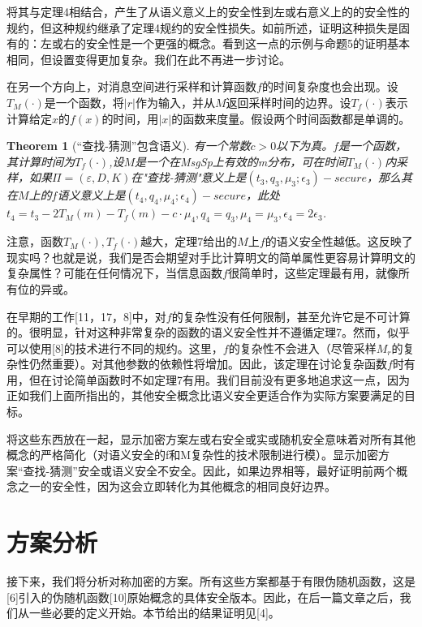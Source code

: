 \documentclass[]{article}
\newtheorem{theorem}{Theorem}
\begin{document}
将其与定理4相结合，产生了从语义意义上的安全性到左或右意义上的的安全性的规约，但这种规约继承了定理4规约的安全性损失。如前所述，证明这种损失是固有的：左或右的安全性是一个更强的概念。看到这一点的示例与命题5的证明基本相同，但设置变得更加复杂。我们在此不再进一步讨论。

在另一个方向上，对消息空间进行采样和计算函数$f$的时间复杂度也会出现。设$T_M(\cdot)$是一个函数，将$|r|$作为输入，并从$M$返回采样时间的边界。设$T_f(\cdot)$表示计算给定$x$的$f(x)$的时间，用$|x|$的函数来度量。假设两个时间函数都是单调的。

\begin{theorem}[“查找-猜测”包含语义]
	有一个常数$c>0$以下为真。$f$是一个函数，其计算时间为$T_f(\cdot)$,设$M$是一个在MsgSp上有效的m分布，可在时间$T_M(\cdot)$内采样，如果$\Pi=(\varepsilon,D,K)$在"查找-猜测"意义上是$(t_3,q_3,\mu_3;\epsilon_3)-secure$，那么其在$M$上的$f$语义意义上是$(t_4,q_4,\mu_4;\epsilon_4)-secure$，此处$t_4=t_3-2T_M(m)-T_f(m)-c\cdot \mu_4,q_4=q_3,\mu_4=\mu_3,\epsilon_4=2\epsilon_3$.
\end{theorem}

注意，函数$T_M(\cdot),T_f(\cdot)$越大，定理7给出的$M$上$f$的语义安全性越低。这反映了现实吗？也就是说，我们是否会期望对手比计算明文的简单属性更容易计算明文的复杂属性？可能在任何情况下，当信息函数$f$很简单时，这些定理最有用，就像所有位的异或。

在早期的工作[11，17，8]中，对$f$的复杂性没有任何限制，甚至允许它是不可计算的。很明显，针对这种非常复杂的函数的语义安全性并不遵循定理7。然而，似乎可以使用[8]的技术进行不同的规约。这里，$f$的复杂性不会进入（尽管采样$M_r$的复杂性仍然重要）。对其他参数的依赖性将增加。因此，该定理在讨论复杂函数$f$时有用，但在讨论简单函数时不如定理7有用。我们目前没有更多地追求这一点，因为正如我们上面所指出的，其他安全概念比语义安全更适合作为实际方案要满足的目标。

将这些东西放在一起，显示加密方案左或右安全或实或随机安全意味着对所有其他概念的严格简化（对语义安全的f和M复杂性的技术限制进行模）。显示加密方案“查找-猜测”安全或语义安全不安全。因此，如果边界相等，最好证明前两个概念之一的安全性，因为这会立即转化为其他概念的相同良好边界。

\section{方案分析}

接下来，我们将分析对称加密的方案。所有这些方案都基于有限伪随机函数，这是[6]引入的伪随机函数[10]原始概念的具体安全版本。因此，在后一篇文章之后，我们从一些必要的定义开始。本节给出的结果证明见[4]。
\end{document}
